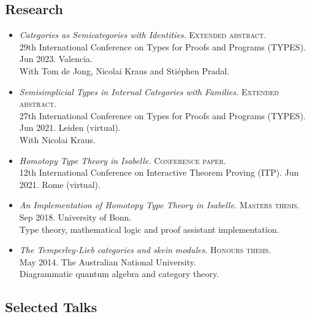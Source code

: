 \documentclass[12pt,a4paper]{article}
\begin{document}
\subsection{Research}

\begin{itemize}
\item
  \emph{Categories as Semicategories with Identities.}
  \textsc{Extended abstract.}\\
  29th International Conference on Types for Proofs and Programs (TYPES).
  Jun 2023.
  Valencia.\\
  With Tom de Jong, Nicolai Kraus and Stiéphen Pradal.\\
\item
  \emph{Semisimplicial Types in Internal Categories with Families.}
  \textsc{Extended abstract.}\\
  27th International Conference on Types for Proofs and Programs (TYPES).
  Jun 2021.
  Leiden (virtual).\\
  With Nicolai Kraus.\\
\item
  \emph{Homotopy Type Theory in Isabelle.}
  \textsc{Conference paper.}\\
  12th International Conference on Interactive Theorem Proving (ITP).
  Jun 2021.
  Rome (virtual).\\
\item
  \emph{An Implementation of Homotopy Type Theory in Isabelle.}
  \textsc{Masters thesis.}\\
  Sep 2018.
  University of Bonn.\\
  Type theory, mathematical logic and proof assistant implementation.\\
\item
  \emph{The Temperley-Lieb categories and skein modules.}
  \textsc{Honours thesis.}\\
  May 2014.
  The Australian National University.\\
  Diagrammatic quantum algebra and category theory.\\
\end{itemize}

\subsection{Selected Talks}
\end{document}

